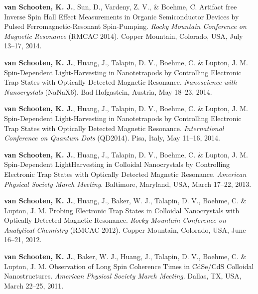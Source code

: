 \documentclass[11pt,letterpaper]{article}
\newcommand{\mhead}[1]{\leavevmode\marginpar{\sffamily\small #1}}
\begin{document}
\mhead{Conference\newline Talks}
\vspace{-1.1em} %
\begin{bibenum}

		\item \textbf{van Schooten, K. J.}, Sun, D., Vardeny, Z. V., \& Boehme, C. Artifact free Inverse Spin Hall Effect Measurements in Organic Semiconductor Devices by Pulsed Ferromagnetic-Resonant Spin-Pumping. \textit{Rocky Mountain Conference on Magnetic Resonance} (RMCAC 2014). Copper Mountain, Colorado, USA, July 13--17, 2014.

		\item \textbf{van Schooten, K. J.}, Huang, J., Talapin, D. V., Boehme, C. \& Lupton, J. M. Spin-Dependent Light-Harvesting in Nanotetrapods by Controlling Electronic Trap States with Optically Detected Magnetic Resonance. \textit{Nanoscience with Nanocrystals} (NaNaX6). Bad Hofgastein, Austria, May 18--23, 2014.
		
		\item \textbf{van Schooten, K. J.}, Huang, J., Talapin, D. V., Boehme, C. \& Lupton, J. M. Spin-Dependent Light-Harvesting in Nanotetrapods by Controlling Electronic Trap States with Optically Detected Magnetic Resonance. \textit{International Conference on Quantum Dots} (QD2014). Pisa, Italy, May 11--16, 2014.
		
		\item \textbf{van Schooten, K. J.}, Huang, J., Talapin, D. V., Boehme, C. \& Lupton, J. M. Spin-Dependent LightHarvesting in Colloidal Nanocrystals by Controlling Electronic Trap States with Optically Detected Magnetic Resonance. \textit{American Physical Society March Meeting}. Baltimore, Maryland, USA, March 17--22, 2013.
		
		\item \textbf{van Schooten, K. J.}, Huang, J., Baker, W. J., Talapin, D. V., Boehme, C. \& Lupton, J. M. Probing Electronic Trap States in Colloidal Nanocrystals with Optically Detected Magnetic Resonance. \textit{Rocky Mountain Conference on Analytical Chemistry} (RMCAC 2012). Copper Mountain, Colorado, USA, June 16--21, 2012.
		
		\item \textbf{van Schooten, K. J.}, Baker, W. J., Huang, J., Talapin, D. V., Boehme, C. \& Lupton, J. M. Observation of Long Spin Coherence Times in CdSe/CdS Colloidal Nanostructures. \textit{American Physical Society March Meeting}. Dallas, TX, USA, March 22--25, 2011.

\end{bibenum}
\vspace{\baselineskip} %
\end{document}
